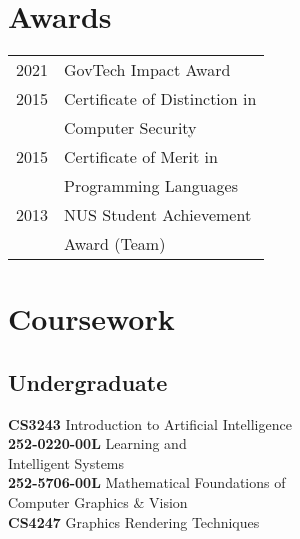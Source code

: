 \documentclass[]{deedy-resume-openfont}
\begin{document}
\begin{minipage}[t]{0.25\textwidth}

\section{Awards}
\begin{tabular}{rl}
2021 &GovTech Impact Award\\
2015	 &Certificate of Distinction in \\ & Computer Security\\
2015	 &Certificate of Merit in \\ &Programming Languages\\
2013	 & NUS Student Achievement\\ &Award (Team)
\end{tabular}
\sectionsep





\section{Coursework}

\subsection{Undergraduate}
\textbf{CS3243} Introduction to Artificial Intelligence \\
\textbf{252-0220-00L} Learning and \\
Intelligent Systems \\
\textbf{252-5706-00L} Mathematical Foundations of \\
Computer Graphics \& Vision \\
\textbf{CS4247} Graphics Rendering Techniques \\


\end{minipage}
\end{document}
